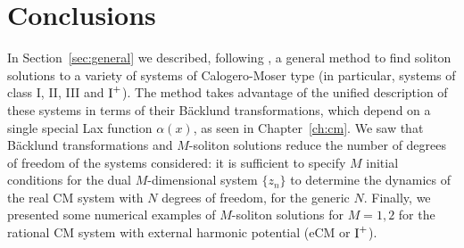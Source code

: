 \section{Conclusions}
In Section~\ref{sec:general} we described, following \cite{philip2019soliton}, a general method to find soliton solutions to a variety of systems of Calogero-Moser type (in particular, systems of class I, II, III and $\textnormal{I}^+$). The method takes advantage of the unified description of these systems in terms of their Bäcklund transformations, which depend on a single special Lax function $\alpha(x)$, as seen in Chapter~\ref{ch:cm}. We saw that Bäcklund transformations and $M$-soliton solutions reduce the number of degrees of freedom of the systems considered: it is sufficient to specify $M$ initial conditions for the dual $M$-dimensional system $\{z_n\}$ to determine the dynamics of the real CM system with $N$ degrees of freedom, for the generic $N$. Finally, we presented some numerical examples of $M$-soliton solutions for $M = 1, 2$ for the rational CM system with external harmonic potential (eCM or $\textnormal{I}^+$).  